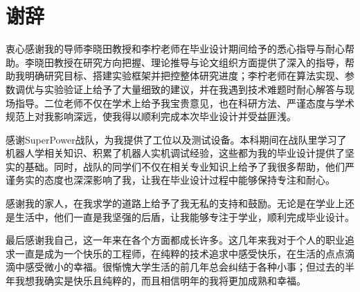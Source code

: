 \chapter*{谢\hspace{0.5em}辞}

衷心感谢我的导师李晓田教授和李柠老师在毕业设计期间给予的悉心指导与耐心帮助。李晓田教授在研究方向把握、理论推导与论文组织方面提供了深入的指导，帮助我明确研究目标、搭建实验框架并把控整体研究进度；李柠老师在算法实现、参数调优与实验验证上给予了大量细致的建议，并在我遇到技术难题时耐心解答与现场指导。二位老师不仅在学术上给予我宝贵意见，也在科研方法、严谨态度与学术规范上对我影响深远，使我得以顺利完成本次毕业设计并受益匪浅。

感谢SuperPower战队，为我提供了工位以及测试设备。本科期间在战队里学习了机器人学相关知识、积累了机器人实机调试经验，这些都为我的毕业设计提供了坚实的基础。同时，战队的同学们不仅在相关专业知识上给予了我很多帮助，他们严谨务实的态度也深深影响了我，让我在毕业设计过程中能够保持专注和耐心。

感谢我的家人，在我求学的道路上给予了我无私的支持和鼓励。无论是在学业上还是生活中，他们一直是我坚强的后盾，让我能够专注于学业，顺利完成毕业设计。

最后感谢我自己，这一年来在各个方面都成长许多。这几年来我对于个人的职业追求一直是成为一个快乐的工程师，在纯粹的技术追求中感受快乐，在生活的点点滴滴中感受微小的幸福。很惭愧大学生活的前几年总会纠结于各种小事；但过去的半年我想我确实是快乐且纯粹的，而且相信明年的我将更加成熟和幸福。
